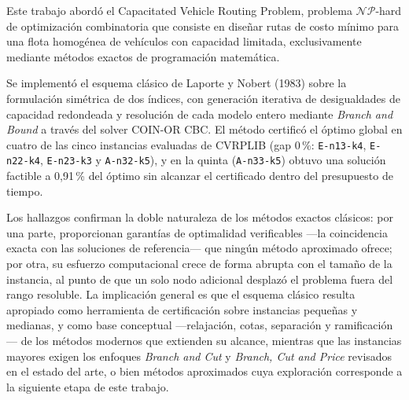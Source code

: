Este trabajo abordó el Capacitated Vehicle Routing Problem, problema
$\mathcal{NP}$-hard de optimización combinatoria que consiste en diseñar
rutas de costo mínimo para una flota homogénea de vehículos con capacidad
limitada, exclusivamente mediante métodos exactos de programación matemática.

Se implementó el esquema clásico de Laporte y Nobert (1983) sobre la
formulación simétrica de dos índices, con generación iterativa de
desigualdades de capacidad redondeada y resolución de cada modelo entero
mediante \textit{Branch and Bound} a través del solver COIN-OR CBC. El método
certificó el óptimo global en cuatro de las cinco instancias evaluadas de
CVRPLIB (gap 0\,\%: \texttt{E-n13-k4}, \texttt{E-n22-k4}, \texttt{E-n23-k3} y
\texttt{A-n32-k5}), y en la quinta (\texttt{A-n33-k5}) obtuvo una solución
factible a 0{,}91\,\% del óptimo sin alcanzar el certificado dentro del
presupuesto de tiempo.

Los hallazgos confirman la doble naturaleza de los métodos exactos clásicos:
por una parte, proporcionan garantías de optimalidad verificables ---la
coincidencia exacta con las soluciones de referencia--- que ningún método
aproximado ofrece; por otra, su esfuerzo computacional crece de forma abrupta
con el tamaño de la instancia, al punto de que un solo nodo adicional desplazó
el problema fuera del rango resoluble. La implicación general es que el
esquema clásico resulta apropiado como herramienta de certificación sobre
instancias pequeñas y medianas, y como base conceptual ---relajación, cotas,
separación y ramificación--- de los métodos modernos que extienden su alcance,
mientras que las instancias mayores exigen los enfoques \textit{Branch and
Cut} y \textit{Branch, Cut and Price} revisados en el estado del arte, o bien
métodos aproximados cuya exploración corresponde a la siguiente etapa de este
trabajo.